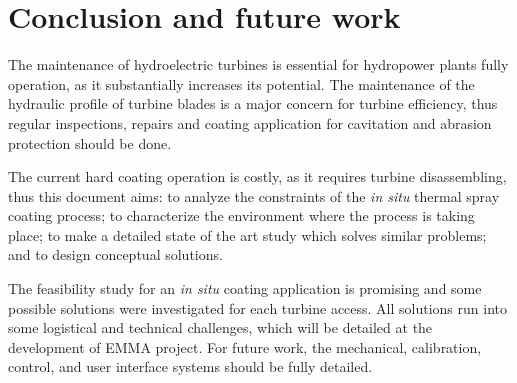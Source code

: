\section{Conclusion and future work}\label{sec:conclusions}
The maintenance of hydroelectric turbines is essential for hydropower plants
fully operation, as it substantially increases its potential. The
maintenance of the hydraulic profile of turbine blades is a major concern for
turbine efficiency, thus regular inspections, repairs and coating application
for cavitation and abrasion protection should be done.

The current hard coating operation is costly, as it requires turbine
disassembling, thus this document aims: to analyze the constraints of the
\textit{in situ} thermal spray coating process; to characterize the environment
where the process is taking place; to make a detailed state of the art study
which solves similar problems; and to design conceptual solutions.


The feasibility study for an \textit{in situ} coating application is promising
and some possible solutions were investigated for each turbine access. All
solutions run into some logistical and technical challenges, which will be
detailed at the development of EMMA project. For future work, the
mechanical, calibration, control, and user interface systems should be fully
detailed.

